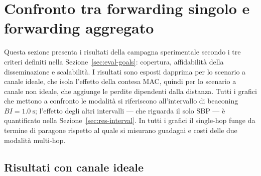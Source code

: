 \section{Confronto tra forwarding singolo e forwarding aggregato}
\label{sec:confronto}
Questa sezione presenta i risultati della campagna sperimentale secondo i tre
criteri definiti nella Sezione~\ref{sec:eval-goals}: copertura, affidabilit\`a
della disseminazione e scalabilit\`a. I risultati sono esposti dapprima per lo scenario a canale
ideale, che isola l'effetto della contesa MAC, quindi per lo scenario a canale
non ideale, che aggiunge le perdite dipendenti dalla distanza. Tutti i
grafici che mettono a confronto le modalit\`a si riferiscono all'intervallo
di beaconing $BI=\SI{1.0}{\second}$; l'effetto degli altri intervalli ---
che riguarda il solo SBP --- \`e quantificato nella
Sezione~\ref{sec:res-interval}. In tutti i grafici il single-hop funge da
termine di paragone rispetto al quale si misurano guadagni e costi delle due
modalit\`a multi-hop.

\subsection{Risultati con canale ideale}
\label{sec:res-ideal}

